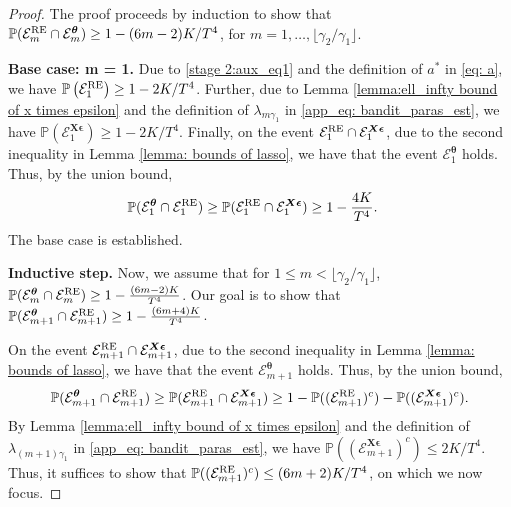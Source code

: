 \documentclass[aos,preprint]{imsart}
\theoremstyle{plain}
\theoremstyle{definition}
\newcommand{\btheta}{\boldsymbol{\theta}}
\newcommand{\bd}[1]{\boldsymbol{#1}}
\newcommand{\bX}{\boldsymbol{X}}
\newcommand{\mE}{\mathcal{E}}
\newcommand{\bepsilon}{\bd{\epsilon}}
\newcommand{\Pro}{\mathbb{P}}
\begin{document}
\begin{appendix}
\begin{proof}
The proof proceeds by induction to show that $\Pro(\mE_m^{\textup{RE}} \cap \mE_m^{\btheta}) \geq 1-(6m-2)K/T^4$, for $m=1,\ldots,\lfloor \gamma_2/\gamma_1\rfloor$. 

\medskip \noindent
\textbf{Base case: m = 1.} Due to \eqref{stage 2:aux_eq1} and the definition of $a^*$ in \eqref{eq: a}, we have $\Pro\left(\mE_1^{\textup{RE}}\right) \geq 1 - 2K/T^4$. Further, due to Lemma \ref{lemma:ell_infty bound of x times epsilon} and the definition of $\lambda_{m\gamma_1}$ in \eqref{app_eq: bandit_paras_est}, 
 we have $\Pro\left(\mE_1^{\bX\bepsilon}\right) \geq 1 - 2K/T^4$. Finally, on the event $\mE_1^{\textup{RE}} \cap \mE_1^{\bX\bepsilon}$,
due to the second inequality in Lemma \ref{lemma: bounds of lasso}, we have that the event $\mE_1^{\btheta}$ holds. Thus, by the union bound,
\begin{align*}
   \Pro(\mE_1^{\btheta}\cap\mE_1^{\textup{RE}})  &\ge \Pro( \mE_1^{\textup{RE}}\cap\mE_1^{\bX\bepsilon})   \ge 1- \frac{4K}{T^4}.
\end{align*}
The base case is established.

\medskip \noindent
\textbf{Inductive step.}  Now, we assume that for $1 \leq m < \lfloor \gamma_2/\gamma_1\rfloor$,  
$\Pro(\mE_m^{\btheta}\cap\mE_m^{\textup{RE}}) \ge 1- \frac{(6m-2)K}{T^4}$. Our goal is to show that 
$\Pro(\mE_{m+1}^{\btheta}\cap\mE_{m+1}^{\textup{RE}}) \ge 1- \frac{(6m+4)K}{T^4}$.
 
On the event $\mE_{m+1}^{\textup{RE}} \cap \mE_{m+1}^{\bX\bepsilon}$,
due to the second inequality in Lemma \ref{lemma: bounds of lasso}, we have that the event $\mE_{m+1}^{\btheta}$ holds. Thus, by the union bound,
\begin{align*}
\Pro(\mE_{m+1}^{\btheta}\cap\mE_{m+1}^{\textup{RE}})  \ge \Pro( \mE_{m+1}^{\textup{RE}}\cap\mE_{m+1}^{\bX\bepsilon})   \ge 1- \Pro( (\mE_{m+1}^{\textup{RE}})^c) - \Pro((\mE_{m+1}^{\bX\bepsilon})^c). 
\end{align*}
By Lemma \ref{lemma:ell_infty bound of x times epsilon} and the definition of $\lambda_{(m+1)\gamma_1}$ in \eqref{app_eq: bandit_paras_est}, 
 we have $\Pro\left((\mE_{m+1}^{\bX\bepsilon})^c\right) \leq 2K/T^4$. Thus, it suffices to show that 
 $\Pro( (\mE_{m+1}^{\textup{RE}})^c) \leq (6m+2)K/T^4$, on which we now focus. 


\end{proof}
\end{appendix}
\end{document}
